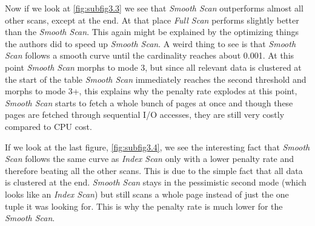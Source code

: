 \documentclass[a4paper,11pt,twoside]{article}
\begin{document}
Now if we look at \autoref{fig:subfig3.3} we see that \textit{Smooth Scan} outperforms almost all other scans, except at the end. At that place \textit{Full Scan} performs slightly better than the \textit{Smooth Scan}. This again might be explained by the optimizing things the authors did to speed up \textit{Smooth Scan}. A weird thing to see is that \textit{Smooth Scan} follows a smooth curve until the cardinality reaches about 0.001. At this point \textit{Smooth Scan} morphs to mode 3, but since all relevant data is clustered at the start of the table \textit{Smooth Scan} immediately reaches the second threshold and morphs to mode 3+, this explains why the penalty rate explodes at this point, \textit{Smooth Scan} starts to fetch a whole bunch of pages at once and though these pages are fetched through sequential I/O accesses, they are still very costly compared to CPU cost.

If we look at the last figure, \autoref{fig:subfig3.4}, we see the interesting fact that \textit{Smooth Scan} follows the same curve as \textit{Index Scan} only with a lower penalty rate and therefore beating all the other scans. This is due to the simple fact that all data is clustered at the end. \textit{Smooth Scan} stays in the pessimistic second mode (which looks like an \textit{Index Scan}) but still scans a whole page instead of just the one tuple it was looking for. This is why the penalty rate is much lower for the \textit{Smooth Scan}.
\end{document}
